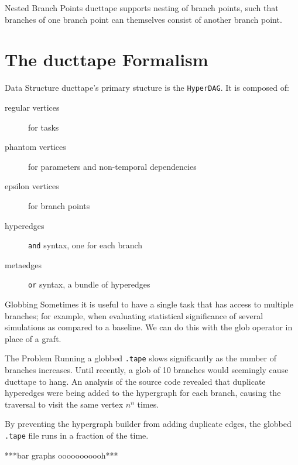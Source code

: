 \documentclass[10pt]{beamer}
\begin{document}
\begin{frame}[fragile]{Nested Branch Points}
ducttape supports nesting of branch points, such that branches of one branch point can themselves consist of another branch point.
\end{frame}

\section{The ducttape Formalism}

\begin{frame}[fragile]{Data Structure}
ducttape's primary stucture is the \texttt{HyperDAG}. It is composed of:
\begin{description}
\item[regular vertices] for tasks
\item[phantom vertices] for parameters and non-temporal dependencies
\item[epsilon vertices] for branch points
\item[hyperedges] \texttt{and} syntax, one for each branch
\item[metaedges] \texttt{or} syntax, a bundle of hyperedges
\end{description}
\end{frame}

\begin{frame}[fragile]{Globbing}
Sometimes it is useful to have a single task that has access to multiple branches; for example, when evaluating statistical significance of several simulations as compared to a baseline. We can do this with the glob operator in place of a graft.
\end{frame}

\begin{frame}[fragile]{The Problem}
Running a globbed \texttt{.tape} slows significantly as the number of branches increases. Until recently, a glob of 10 branches would seemingly cause ducttape to hang. An analysis of the source code revealed that duplicate hyperedges were being added to the hypergraph for each branch, causing the traversal to visit the same vertex $n^n$ times.

By preventing the hypergraph builder from adding duplicate edges, the globbed \texttt{.tape} file runs in a fraction of the time.

***bar graphs ooooooooooh***

\end{frame}
\end{document}

